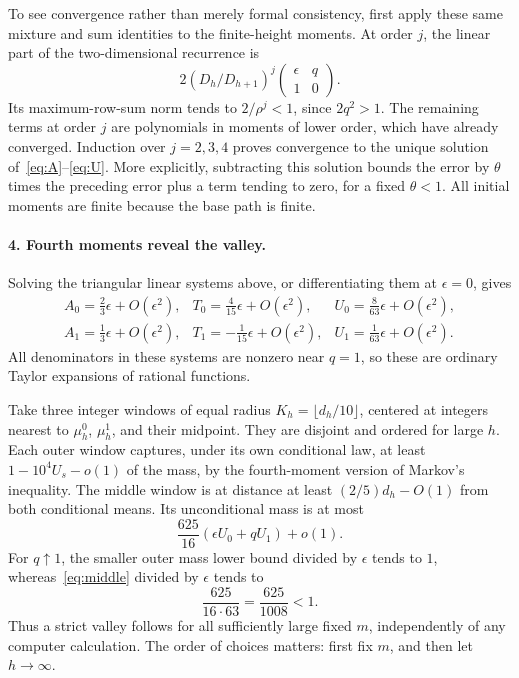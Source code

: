 \documentclass[11pt]{article}
\begin{document}
To see convergence rather than merely formal consistency, first apply these same mixture and sum identities to the finite-height moments. At order $j$, the linear part of the two-dimensional recurrence is
\[
 2(D_h/D_{h+1})^j
 \begin{pmatrix}\epsilon&q\\1&0\end{pmatrix}.
\]
Its maximum-row-sum norm tends to $2/\rho^j<1$, since $2q^2>1$. The remaining terms at order $j$ are polynomials in moments of lower order, which have already converged. Induction over $j=2,3,4$ proves convergence to the unique solution of~\eqref{eq:A}--\eqref{eq:U}. More explicitly, subtracting this solution bounds the error by $\theta$ times the preceding error plus a term tending to zero, for a fixed $\theta<1$. All initial moments are finite because the base path is finite.

\paragraph{4. Fourth moments reveal the valley.}
Solving the triangular linear systems above, or differentiating them at $\epsilon=0$, gives
\begin{equation}\label{eq:slopes}
\begin{array}{lll}
 A_0=\frac23\epsilon+O(\epsilon^2),&
 T_0=\frac4{15}\epsilon+O(\epsilon^2),&
 U_0=\frac8{63}\epsilon+O(\epsilon^2),\\[2pt]
 A_1=\frac13\epsilon+O(\epsilon^2),&
 T_1=-\frac1{15}\epsilon+O(\epsilon^2),&
 U_1=\frac1{63}\epsilon+O(\epsilon^2).
\end{array}
\end{equation}
All denominators in these systems are nonzero near $q=1$, so these are ordinary Taylor expansions of rational functions.

Take three integer windows of equal radius $K_h=\lfloor d_h/10\rfloor$, centered at integers nearest to $\mu_h^0$, $\mu_h^1$, and their midpoint. They are disjoint and ordered for large $h$. Each outer window captures, under its own conditional law, at least $1-10^4U_s-o(1)$ of the mass, by the fourth-moment version of Markov's inequality. The middle window is at distance at least $(2/5)d_h-O(1)$ from both conditional means. Its unconditional mass is at most
\begin{equation}\label{eq:middle}
 \frac{625}{16}(\epsilon U_0+qU_1)+o(1).
\end{equation}
For $q\uparrow1$, the smaller outer mass lower bound divided by $\epsilon$ tends to $1$, whereas~\eqref{eq:middle} divided by $\epsilon$ tends to
\[
 \frac{625}{16\cdot63}=\frac{625}{1008}<1.
\]
Thus a strict valley follows for all sufficiently large fixed $m$, independently of any computer calculation. The order of choices matters: first fix $m$, and then let $h\to\infty$.
\end{document}
